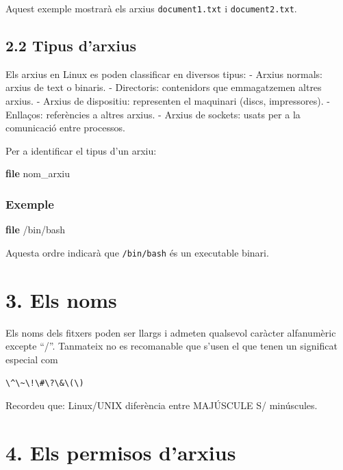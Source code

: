 \documentclass[
  12 pt,
  a4paper,
]{article}
\newenvironment{Shaded}{\begin{snugshade}}{\end{snugshade}}
\newcommand{\FunctionTok}[1]{\textcolor[rgb]{0.13,0.29,0.53}{\textbf{#1}}}
\newcommand{\NormalTok}[1]{#1}
\begin{document}
Aquest exemple mostrarà els arxius \texttt{document1.txt} i
\texttt{document2.txt}.

\subsection{2.2 Tipus d'arxius}\label{tipus-darxius}

Els arxius en Linux es poden classificar en diversos tipus: - Arxius
normals: arxius de text o binaris. - Directoris: contenidors que
emmagatzemen altres arxius. - Arxius de dispositiu: representen el
maquinari (discs, impressores). - Enllaços: referències a altres arxius.
- Arxius de sockets: usats per a la comunicació entre processos.

Per a identificar el tipus d'un arxiu:

\begin{Shaded}
\begin{Highlighting}[]
\FunctionTok{file}\NormalTok{ nom\_arxiu}
\end{Highlighting}
\end{Shaded}

\subsubsection{Exemple}\label{exemple}

\begin{Shaded}
\begin{Highlighting}[]
\FunctionTok{file}\NormalTok{ /bin/bash}
\end{Highlighting}
\end{Shaded}

Aquesta ordre indicarà que \texttt{/bin/bash} és un executable binari.

\section{3. Els noms}\label{els-noms}

Els noms dels fitxers poden ser llargs i admeten qualsevol caràcter
alfanumèric excepte ``/''. Tanmateix no es recomanable que s'usen el que
tenen un significat especial com

\texttt{\textbackslash{}\^{}\textbackslash{}\textasciitilde{}\textbackslash{}!\textbackslash{}\#\textbackslash{}?\textbackslash{}\&\textbackslash{}(\textbackslash{})}

Recordeu que: Linux/UNIX diferència entre MAJÚSCULE S/ minúscules.

\section{4. Els permisos d'arxius}\label{els-permisos-darxius}
\end{document}
